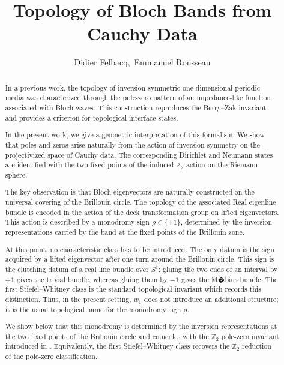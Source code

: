 \documentclass[preprint,12pt]{elsarticle}
\def\bbZ{\mathbb Z}
\begin{document}
\begin{frontmatter}
\title{Topology of Bloch Bands from Cauchy Data}

\author{Didier Felbacq,\, Emmanuel Rousseau}

\begin{abstract}

In a previous work, the topology of inversion-symmetric one-dimensional periodic media was characterized through the pole-zero pattern of an impedance-like function associated with Bloch waves. This construction reproduces the Berry--Zak invariant and provides a criterion for topological interface states.

In the present work, we give a geometric interpretation of this formalism. We show that poles and zeros arise naturally from the action of inversion symmetry on the projectivized space of Cauchy data. The corresponding Dirichlet and Neumann states are identified with the two fixed points of the induced $\bbZ_2$ action on the Riemann sphere.

The key observation is that Bloch eigenvectors are naturally constructed on the universal covering of the Brillouin circle. The topology of the associated Real eigenline bundle is encoded in the action of the deck transformation group on lifted eigenvectors. This action is described by a monodromy sign $\rho\in\{\pm1\}$, determined by the inversion representations carried by the band at the fixed points of the Brillouin zone.

At this point, no characteristic class has to be introduced. The only datum is the sign acquired by a lifted eigenvector after one turn around the Brillouin circle. This sign is the clutching datum of a real line bundle over $S^1$: gluing the two ends of an interval by $+1$ gives the trivial bundle, whereas gluing them by $-1$ gives the M�bius bundle. The first Stiefel--Whitney class is the standard topological invariant which records this distinction. Thus, in the present setting, $w_1$ does not introduce an additional structure; it is the usual topological name for the monodromy sign $\rho$.

We show below that this monodromy is determined by the inversion representations at the two fixed points of the Brillouin circle and coincides with the $\bbZ_2$ pole-zero invariant introduced in \cite{FelbacqAnnalen}. Equivalently, the first Stiefel--Whitney class recovers the $\bbZ_2$ reduction of the pole-zero classification.


\end{abstract}
\end{frontmatter}
\end{document}
